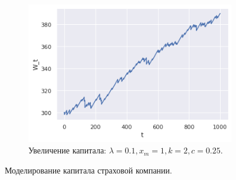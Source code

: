 \begin{figure}[ht]
\begin{subfigure}[b]{0.49\textwidth}
        \centering
        \includegraphics[width=\textwidth]{./resources/ins_comp_increasing.png}
        \caption{Увеличение капитала: $\lambda = 0.1, x_m = 1, k = 2, c = 0.25. $}
        \label{subfig:ins_comp_increasing}
    \end{subfigure}
    \caption{Моделирование капитала страховой компании.}
    \label{fig:ins_comp}
\end{figure}